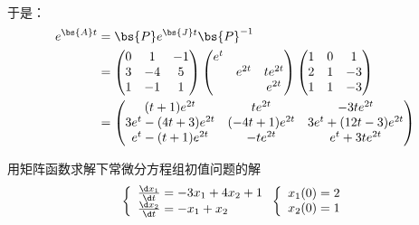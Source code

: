 \documentclass[12pt, a4paper, oneside, UTF8]{ctexbook}
\begin{document}
\begin{solution}
\begin{align*}
    \end{align*}
    于是：
    \begin{align*}
        e^{\bs{A}t}&=\bs{P}e^{\bs{J}t}\bs{P}^{-1} \\
        &=\begin{pmatrix}
            0 & 1 &-1 \\
            3 & -4 &5 \\
            1 & -1 &1
        \end{pmatrix} \begin{pmatrix}
            e^{t}& & \\
            & e^{2t}&te^{2t} \\
            & & e^{2t}
        \end{pmatrix}\begin{pmatrix}
            1	&0	&1 \\
            2	&1	&-3\\
            1	&1	&-3      
        \end{pmatrix}\\
        &=\begin{pmatrix}
            (t+1)e^{2t}&te^{2t}&-3te^{2t}\\
            3e^{t}-(4t+3)e^{2t}&(-4t+1)e^{2t}&3e^{t}+(12t-3)e^{2t}\\
            e^{t}-(t+1)e^{2t}&-te^{2t}&e^{t}+3te^{2t}
        \end{pmatrix}
    \end{align*}
\end{solution}

\begin{question}
    用矩阵函数求解下常微分方程组初值问题的解
    \begin{align*}
    \left\{
        \begin{array}{ll}
            \frac{\d x_1}{\d t}=-3x_1+4x_2+1\\
            \frac{\d x_2}{\d t}=-x_1+x_2
        \end{array}
        \right.
    \left\{
        \begin{array}{ll}
            x_1(0)=2\\
            x_2(0)=1
        \end{array}
        \right.
    \end{align*}
\end{question}
\end{document}
